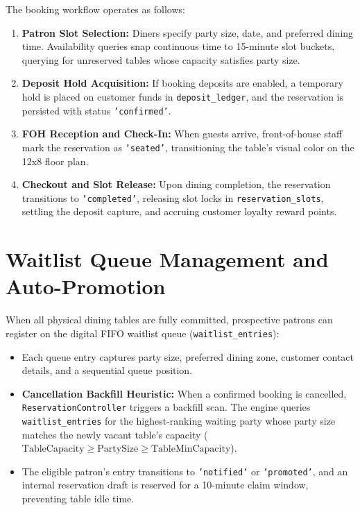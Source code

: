 The booking workflow operates as follows:
\begin{enumerate}
    \item \textbf{Patron Slot Selection:} Diners specify party size, date, and preferred dining time. Availability queries snap continuous time to 15-minute slot buckets, querying for unreserved tables whose capacity satisfies party size.
    \item \textbf{Deposit Hold Acquisition:} If booking deposits are enabled, a temporary hold is placed on customer funds in \texttt{deposit\_ledger}, and the reservation is persisted with status \texttt{'confirmed'}.
    \item \textbf{FOH Reception and Check-In:} When guests arrive, front-of-house staff mark the reservation as \texttt{'seated'}, transitioning the table's visual color on the 12x8 floor plan.
    \item \textbf{Checkout and Slot Release:} Upon dining completion, the reservation transitions to \texttt{'completed'}, releasing slot locks in \texttt{reservation\_slots}, settling the deposit capture, and accruing customer loyalty reward points.
\end{enumerate}

\section{Waitlist Queue Management and Auto-Promotion}
\label{sec:feat_waitlist}
When all physical dining tables are fully committed, prospective patrons can register on the digital FIFO waitlist queue (\texttt{waitlist\_entries}):
\begin{itemize}
    \item Each queue entry captures party size, preferred dining zone, customer contact details, and a sequential queue position.
    \item \textbf{Cancellation Backfill Heuristic:} When a confirmed booking is cancelled, \texttt{ReservationController} triggers a backfill scan. The engine queries \texttt{waitlist\_entries} for the highest-ranking waiting party whose party size matches the newly vacant table's capacity ($\text{TableCapacity} \ge \text{PartySize} \ge \text{TableMinCapacity}$).
    \item The eligible patron's entry transitions to \texttt{'notified'} or \texttt{'promoted'}, and an internal reservation draft is reserved for a 10-minute claim window, preventing table idle time.
\end{itemize}

